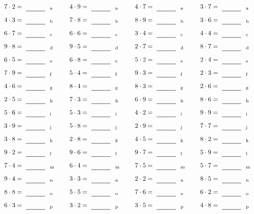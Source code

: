 \documentclass
[
  draft    = true,
  fontsize = 11pt,
  parskip  = half-
]
{scrartcl}
\begin{document}
\par\vfill\par
\begin{align*}
    \pline{7\cdot2}&=\rline{a}
  & \pline{4\cdot9}&=\rline{a}
  & \pline{4\cdot7}&=\rline{a}
  & \pline{3\cdot7}&=\rline{a} \\[1ex]
    \pline{4\cdot3}&=\rline{b}
  & \pline{7\cdot8}&=\rline{b}
  & \pline{8\cdot9}&=\rline{b}
  & \pline{3\cdot6}&=\rline{b} \\[1ex]
    \pline{6\cdot7}&=\rline{c}
  & \pline{6\cdot6}&=\rline{c}
  & \pline{3\cdot4}&=\rline{c}
  & \pline{4\cdot4}&=\rline{c} \\[1ex]
    \pline{9\cdot8}&=\rline{d}
  & \pline{9\cdot5}&=\rline{d}
  & \pline{2\cdot7}&=\rline{d}
  & \pline{8\cdot7}&=\rline{d} \\[1ex]
    \pline{6\cdot5}&=\rline{e}
  & \pline{6\cdot8}&=\rline{e}
  & \pline{5\cdot2}&=\rline{e}
  & \pline{2\cdot4}&=\rline{e} \\[1ex]
    \pline{7\cdot9}&=\rline{f}
  & \pline{5\cdot4}&=\rline{f}
  & \pline{9\cdot3}&=\rline{f}
  & \pline{2\cdot3}&=\rline{f} \\[1ex]
    \pline{4\cdot6}&=\rline{g}
  & \pline{8\cdot4}&=\rline{g}
  & \pline{8\cdot3}&=\rline{g}
  & \pline{2\cdot6}&=\rline{g} \\[1ex]
    \pline{2\cdot5}&=\rline{h}
  & \pline{7\cdot3}&=\rline{h}
  & \pline{6\cdot9}&=\rline{h}
  & \pline{8\cdot6}&=\rline{h} \\[1ex]
    \pline{5\cdot6}&=\rline{i}
  & \pline{5\cdot3}&=\rline{i}
  & \pline{4\cdot2}&=\rline{i}
  & \pline{9\cdot9}&=\rline{i} \\[1ex]
    \pline{3\cdot9}&=\rline{j}
  & \pline{5\cdot8}&=\rline{j}
  & \pline{2\cdot9}&=\rline{j}
  & \pline{7\cdot7}&=\rline{j} \\[1ex]
    \pline{3\cdot8}&=\rline{k}
  & \pline{2\cdot8}&=\rline{k}
  & \pline{4\cdot5}&=\rline{k}
  & \pline{8\cdot2}&=\rline{k} \\[1ex]
    \pline{9\cdot2}&=\rline{l}
  & \pline{9\cdot6}&=\rline{l}
  & \pline{9\cdot7}&=\rline{l}
  & \pline{5\cdot9}&=\rline{l} \\[1ex]
    \pline{7\cdot4}&=\rline{m}
  & \pline{6\cdot4}&=\rline{m}
  & \pline{7\cdot5}&=\rline{m}
  & \pline{5\cdot7}&=\rline{m} \\[1ex]
    \pline{9\cdot4}&=\rline{n}
  & \pline{3\cdot3}&=\rline{n}
  & \pline{2\cdot2}&=\rline{n}
  & \pline{8\cdot5}&=\rline{n} \\[1ex]
    \pline{8\cdot8}&=\rline{o}
  & \pline{5\cdot5}&=\rline{o}
  & \pline{7\cdot6}&=\rline{o}
  & \pline{6\cdot2}&=\rline{o} \\[1ex]
    \pline{6\cdot3}&=\rline{p}
  & \pline{3\cdot2}&=\rline{p}
  & \pline{3\cdot5}&=\rline{p}
  & \pline{4\cdot8}&=\rline{p}
\end{align*}
\end{document}
